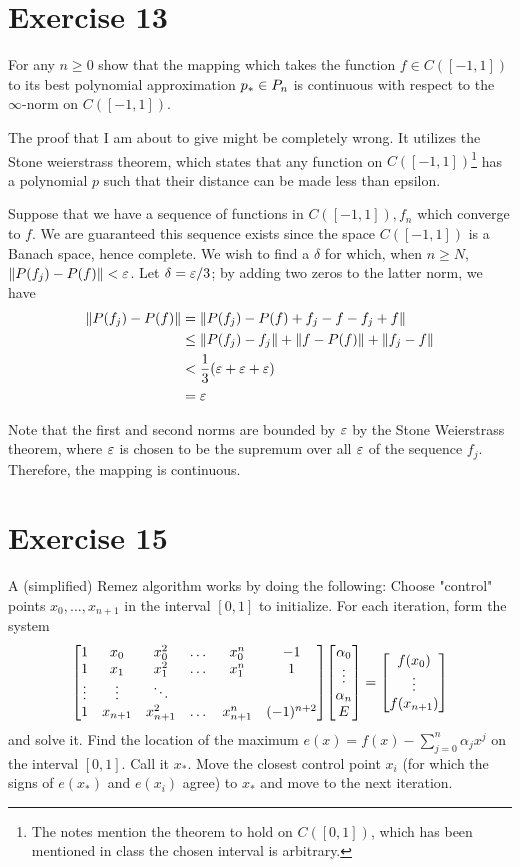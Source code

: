 \newpage
\section{Exercise 13}
For any $n \geq 0$ show that the mapping which takes the function $f\in C([-1, 1])$ to its best polynomial approximation $p_* \in P_n$ is continuous with respect to the $\infty$-norm on $C([-1, 1])$.
\partbreak
\begin{solution}

    The proof that I am about to give might be completely wrong. It utilizes the Stone weierstrass theorem, which states that any function on $C([-1, 1])$\footnote{The notes mention the theorem to hold on $C([0, 1])$, which has been mentioned in class the chosen interval is arbitrary.} has a polynomial $p$ such that their distance can be made less than epsilon. \par

    \jump
    Suppose that we have a sequence of functions in $C([-1, 1]), f_n$ which converge to $f$. We are guaranteed this sequence exists since the space $C([-1, 1])$ is a Banach space, hence complete. We wish to find a $\delta$ for which, when $n \geq N$, $\norm{P(f_j) - P(f)} < \varepsilon$. Let $\delta = \varepsilon / 3$; by adding two zeros to the latter norm, we have
    \begin{align*}
        \norm{P(f_j) - P(f)} &= \norm{P(f_j) - P(f) + f_j - f - f_j + f}\\
        &\leq \norm{P(f_j) - f_j} + \norm{f - P(f)} + \norm{f_j - f} \\
        &< \frac{1}{3}(\varepsilon + \varepsilon + \varepsilon)\\
        &= \varepsilon
    \end{align*}
    
    Note that the first and second norms are bounded by $\varepsilon$ by the Stone Weierstrass theorem, where $\varepsilon$ is chosen to be the supremum over all $\varepsilon$ of the sequence $f_j$. Therefore, the mapping is continuous.  
\end{solution}
\newcommand{\xstar}{x_*}



\newpage
\section{Exercise 15}
A (simplified) Remez algorithm works by doing the following: Choose "control" points $x_0, ..., x_{n+1}$ in the interval $[0, 1]$ to initialize. For each iteration, form the system
\[
\mqty[1 &x_0&x_0^2&\dots &x_0^n&-1\\
      1 &x_1&x_1^2&\dots &x_1^n& 1\\
      \vdots&\vdots&\ddots  &     &  \\
      1&x_{n+1}&x_{n+1}^2&\dots&x_{n+1}^n&(-1)^{n+2}] 
\mqty[\alpha_0\\\vdots\\\alpha_n\\E] = \mqty[f(x_0)\\ \vdots\\f(x_{n+1})]
\]
and solve it. Find the location of the maximum $e(x) = f(x) - \sum_{j = 0}^n\alpha_j x^j$ on the interval $[0, 1]$. Call it $\xstar$. Move the closest control point $x_i$ (for which the signs of $e(\xstar)$ and $e(x_i)$ agree) to $\xstar$ and move to the next iteration.  
